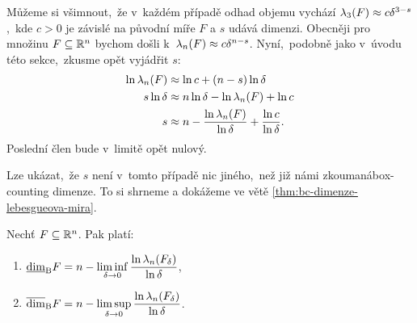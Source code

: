 Můžeme si všimnout,~že v~každém případě odhad objemu vychází $\lambda_3(F)\approx c\delta^{3-s}$,~kde $c>0$ je závislé na původní míře $F$ a $s$ udává dimenzi. Obecněji pro množinu $F\subseteq\mathbb{R}^n$ bychom došli k~$\lambda_n(F)\approx c\delta^{n-s}$. Nyní,~podobně jako v~úvodu této sekce,~zkusme opět vyjádřit $s$:
\begin{align*}
    \ln{\ensuremath{\lambda_n}(F)}&\approx\ln{c}+(n-s)\ln{\delta}\\
    s\ln{\delta}&\approx n\ln{\delta}-\ln{\ensuremath{\lambda_n}(F)}+\ln{c}\\
    s&\approx n-\dfrac{\ln{\ensuremath{\lambda_n}(F)}}{\ln{\delta}}+\dfrac{\ln{c}}{\ln{\delta}}.
\end{align*}
Poslední člen bude v~limitě opět nulový.

Lze ukázat,~že $s$ není v~tomto případě nic jiného,~než již námi zkoumaná\linebreak{}box-counting dimenze. To si shrneme a dokážeme ve větě \ref{thm:bc-dimenze-lebesgueova-mira}.
\begin{theorem}\label{thm:bc-dimenze-lebesgueova-mira}
    Nechť $F\subseteq\mathbb{R}^n$. Pak platí: 
    \begin{enumerate}[label=(\roman*)]
        \item $\underline{\dim}_\textup{B}{F}=n-\liminf\limits_{\delta\to 0}\dfrac{\ln{\ensuremath{\lambda_n}(F_\delta)}}{\ln{\delta}}$,
        \item $\overline{\dim}_\textup{B}{F}=n-\limsup\limits_{\delta\to 0}\dfrac{\ln{\ensuremath{\lambda_n}(F_\delta)}}{\ln{\delta}}$.
    \end{enumerate}
\end{theorem}
